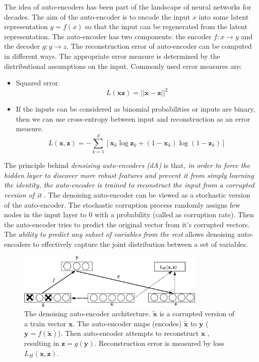The idea of auto-encoders has been part of the landscape of neural networks for decades. The aim of the auto-encoder is to encode the input $x$ into some latent representation $y = f(x)$ so that the input can be regenerated from the latent representation. The auto-encoder has two components: the encoder $f:x \rightarrow y$ and the decoder $g:y \rightarrow z$. The reconstruction error of auto-encoder can be computed in different ways. The appropriate error measure is determined by the distributional assumptions on the input. Commonly used error measures are:
\begin{itemize}
\item Squared error.
$$ L(\mathbf{x} \mathbf{z}) = || \mathbf{x} - \mathbf{z} ||^2$$
\item If the inputs can be considered as binomial probabilities or inputs are binary, then we can use cross-entropy between input and reconstruction as an error measure.
$$L(\mathbf{x}, \mathbf{z}) = - \sum^d_{k=1}[\mathbf{x}_k \log \mathbf{z}_k + (1 - \mathbf{x}_k)\log(1 - \mathbf{z}_k)]$$
\end{itemize}

The principle behind \emph{denoising auto-encoders (dA)} is that, \textit{in order to force the hidden layer to discover more robust features and prevent it from simply learning the identity, the auto-encoder is trained to reconstruct the input from a corrupted version of it} \cite{vincent2008extracting}. The denoising auto-encoder can be viewed as a stochastic version of the auto-encoder. The stochastic corruption process randomly assigns few nodes in the input layer to $0$ with a probability (called as corruption rate). Then the auto-encoder tries to predict the original vector from it's corrupted vectors. The \textit{ability to predict any subset of variables from the rest} allows denoising auto-encoders to effectively capture the joint distribution between a set of variables.

\begin{figure}[ht]
\centering
\includegraphics[width=0.8\textwidth]{./imgs/sda.eps}
\caption[The denoising auto-encoder architecture]{The denoising auto-encoder architecture. $\mathbf{\tilde{x}}$ is a corrupted version of a train vector $\mathbf{x}$. The auto-encoder maps (encodes) $\mathbf{\tilde{x}}$ to $\mathbf{y}$ ($\mathbf{y} = f(\mathbf{\tilde{x}})$). Then auto-encoder attempts to reconstruct $\mathbf{x}$ , resulting in $ \mathbf{z} = g(\mathbf{y}) $. Reconstruction error is measured by loss $L_{H}(\mathbf{x},\mathbf{z})$. }
\label{fig:sdaChain}
\end{figure}

